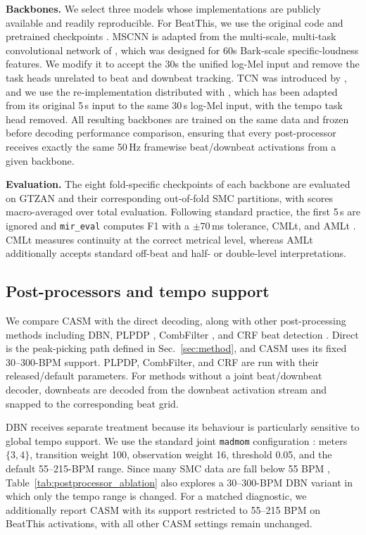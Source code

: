 \documentclass{article}
\begin{document}
\textbf{Backbones.} We select three models whose implementations are publicly available and readily reproducible. For BeatThis, we use the original code and pretrained checkpoints \cite{foscarin2024beat}. MSCNN is adapted from the multi-scale, multi-task convolutional network of \cite{he2026dynest}, which was designed for 60s Bark-scale specific-loudness features. We modify it to accept the 30s the unified log-Mel input and remove the task heads unrelated to beat and downbeat tracking. TCN was introduced by \cite{bock2020deconstruct}, and we use the re-implementation distributed with \cite{he2026dynest}, which has been adapted from its original 5\,s input to the same 30\,s log-Mel input, with the tempo task head removed. All resulting backbones are trained on the same data and frozen before decoding performance comparison, ensuring that every post-processor receives exactly the same 50\,Hz framewise beat/downbeat activations from a given backbone.

\textbf{Evaluation.} The eight fold-specific checkpoints of each backbone are evaluated on GTZAN and their corresponding out-of-fold SMC partitions, with scores macro-averaged over total evaluation. Following standard practice, the first 5\,s are ignored and \texttt{mir\_eval} computes F1 with a $\pm70$\,ms tolerance, CMLt, and AMLt \cite{raffel2014mireval}. CMLt measures continuity at the correct metrical level, whereas AMLt additionally accepts standard off-beat and half- or double-level interpretations.

\subsection{Post-processors and tempo support}
We compare CASM with the direct decoding, along with other post-processing methods including DBN, PLPDP \cite{chiu2023localperiodicity}, CombFilter \cite{bock2015combfilter}, and CRF beat detection \cite{korzeniowski2014crf}. Direct is the peak-picking path defined in Sec.~\ref{sec:method}, and CASM uses its fixed 30--300-BPM support. PLPDP, CombFilter, and CRF are run with their released/default parameters. For methods without a joint beat/downbeat decoder, downbeats are decoded from the downbeat activation stream and snapped to the corresponding beat grid.

DBN receives separate treatment because its behaviour is particularly sensitive to global tempo support. We use the standard joint \texttt{madmom} configuration \cite{krebs2015dbn}: meters $\{3,4\}$, transition weight 100, observation weight 16, threshold 0.05, and the default 55--215-BPM range. Since many SMC data are fall below 55 BPM \cite{ahn2026smcblindspot}, Table~\ref{tab:postprocessor_ablation} also explores a 30--300-BPM DBN variant in which only the tempo range is changed. For a matched diagnostic, we additionally report CASM with its support restricted to 55--215 BPM on BeatThis activations, with all other CASM settings remain unchanged.
\end{document}
